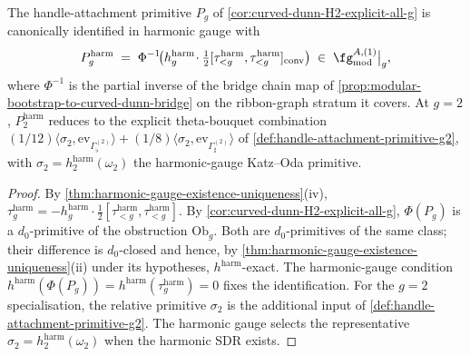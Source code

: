 \begin{lemma}
\label{lem:Pg-in-harmonic-gauge}
\ClaimStatusConditional
The handle-attachment primitive \(P_{g}\) of
\autoref{cor:curved-dunn-H2-explicit-all-g} is canonically
identified in harmonic gauge with
\[
 P_{g}^{\mathrm{harm}}
 \;=\;
 \Phi^{-1}\!\bigl(h^{\mathrm{harm}}_{g}\!
 \cdot \tfrac{1}{2}[\tau_{<g}^{\mathrm{harm}},
 \tau_{<g}^{\mathrm{harm}}]_{\mathrm{conv}}\bigr)
 \;\in\;
 \fg^{A,(1)}_{\mathrm{mod}}\big|_{g},
\]
where \(\Phi^{-1}\) is the partial inverse of the bridge chain map
of \autoref{prop:modular-bootstrap-to-curved-dunn-bridge} on the
ribbon-graph stratum it covers. At \(g = 2\),
\(P_{2}^{\mathrm{harm}}\) reduces to the explicit theta-bouquet
combination
\((1/12)\langle\sigma_{2}, \mathrm{ev}_{\Gamma^{(2)}_{\flat}}\rangle
+ (1/8)\langle\sigma_{2},
\mathrm{ev}_{\Gamma^{(2)}_{\sharp}}\rangle\) of
\autoref{def:handle-attachment-primitive-g2}, with
\(\sigma_{2} = h^{\mathrm{harm}}_{2}(\omega_{2})\) the
harmonic-gauge Katz--Oda primitive.
\end{lemma}

\begin{proof}
By \autoref{thm:harmonic-gauge-existence-uniqueness}(iv),
\(\tau_{g}^{\mathrm{harm}} = -h^{\mathrm{harm}}_{g} \cdot
\tfrac{1}{2}[\tau_{<g}^{\mathrm{harm}}, \tau_{<g}^{\mathrm{harm}}]\).
By \autoref{cor:curved-dunn-H2-explicit-all-g}, \(\Phi(P_{g})\) is
a \(d_{0}\)-primitive of the obstruction \(\mathrm{Ob}_{g}\).
Both are \(d_{0}\)-primitives of the same class; their difference
is \(d_{0}\)-closed and hence, by
\autoref{thm:harmonic-gauge-existence-uniqueness}(ii) under its
hypotheses,
\(h^{\mathrm{harm}}\)-exact. The harmonic-gauge condition
\(h^{\mathrm{harm}}(\Phi(P_{g}))
= h^{\mathrm{harm}}(\tau_{g}^{\mathrm{harm}}) = 0\) fixes the
identification. For the \(g = 2\) specialisation, the
relative primitive \(\sigma_{2}\) is the additional input of
\autoref{def:handle-attachment-primitive-g2}. The harmonic gauge
selects the representative
\(\sigma_{2}=h^{\mathrm{harm}}_{2}(\omega_{2})\) when the harmonic
SDR exists.
\end{proof}

